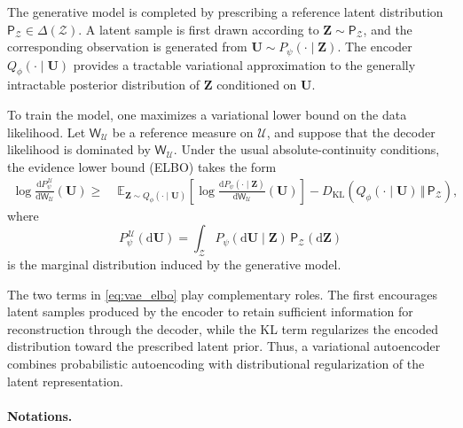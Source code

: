 \documentclass[11pt]{article}
\renewcommand{\d}{\mathrm{d}}
\begin{document}
The generative model is completed by prescribing a reference latent distribution $\mathsf P_{\mathcal Z}\in\Delta(\mathcal Z)$. A latent sample is first drawn according to $\mathbf Z\sim\mathsf P_{\mathcal Z}$, and the corresponding observation is generated from $\mathbf U\sim P_\psi(\cdot\mid\mathbf Z)$. The encoder $Q_\phi(\cdot\mid\mathbf U)$ provides a tractable variational approximation to the generally intractable posterior distribution of $\mathbf Z$ conditioned on $\mathbf U$.

To train the model, one maximizes a variational lower bound on the data likelihood. Let $\mathsf W_{\mathcal U}$ be a reference measure on $\mathcal U$, and suppose that the decoder likelihood is dominated by $\mathsf W_{\mathcal U}$. Under the usual absolute-continuity conditions, the evidence lower bound (ELBO) takes the form
\begin{equation}
\begin{aligned}
    \log
    \frac{\d P_\psi^{\,\mathcal U}}
         {\d\mathsf W_{\mathcal U}}(\mathbf U)
    \geq
    &\;
    \mathbb E_{\mathbf Z\sim Q_\phi(\cdot\mid\mathbf U)}
    \left[
        \log
        \frac{\d P_\psi(\cdot\mid\mathbf Z)}
             {\d\mathsf W_{\mathcal U}}(\mathbf U)
    \right]-
    D_{\mathrm{KL}}
    \left(
        Q_\phi(\cdot\mid\mathbf U)
        \,\Vert\,
        \mathsf P_{\mathcal Z}
    \right),
\end{aligned}
\label{eq:vae_elbo}
\end{equation}
where
\[
P_\psi^{\,\mathcal U}(\d\mathbf U)=\int_{\mathcal Z} P_\psi(\d\mathbf U\mid\mathbf Z)\,\mathsf P_{\mathcal Z}(\d\mathbf Z)
\]
is the marginal distribution induced by the generative model.

The two terms in \eqref{eq:vae_elbo} play complementary roles. The first encourages latent samples produced by the encoder to retain sufficient information for reconstruction through the decoder, while the KL term regularizes the encoded distribution toward the prescribed latent prior. Thus, a variational autoencoder combines probabilistic autoencoding with distributional regularization of the latent representation.

\paragraph{Notations.}
\end{document}
